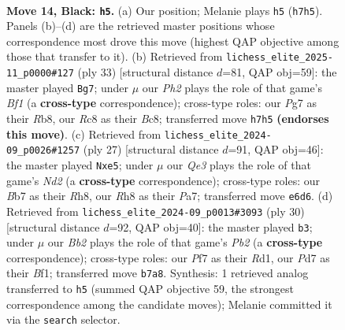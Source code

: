 \documentclass[11pt]{article}
\begin{document}
\clearpage

\begin{figure}[p]\centering
\begin{subfigure}{0.46\textwidth}\centering
\resizebox{\linewidth}{!}{%
\newchessgame
\chessboard[
  setfen={2r1kbnr/pb1p1ppp/4q3/2p1P1P1/2p2P1P/2P4R/PP3Q2/RNB1KB2 b Qk - 0 14},
  showmover=false,
  pgfstyle=straightmove, color=movearrow, markmove={h7-h5}
]}
\caption{}
\end{subfigure}\hfill
\begin{subfigure}{0.46\textwidth}\centering
\resizebox{\linewidth}{!}{%
\newchessgame
\chessboard[
  setfen={1rb1kb1r/2pp1p2/2n1q1pp/2p1P3/p1P4P/P1B2NP1/1P2QP2/2KR1B1R b k - 0 17},
  showmover=false,
  pgfstyle=straightmove, color=movearrow, markmove={f8-g7}
]}
\caption{}
\end{subfigure}
\\[4pt]
\begin{subfigure}{0.46\textwidth}\centering
\resizebox{\linewidth}{!}{%
\newchessgame
\chessboard[
  setfen={r1b1k2r/pp1nppb1/7p/2pPP1p1/1q6/1P4B1/P1PN1PPP/R2QK1NR b KQkq - 2 14},
  showmover=false,
  pgfstyle=straightmove, color=movearrow, markmove={d7-e5}
]}
\caption{}
\end{subfigure}\hfill
\begin{subfigure}{0.46\textwidth}\centering
\resizebox{\linewidth}{!}{%
\newchessgame
\chessboard[
  setfen={r1b2rk1/3n1ppp/p3p3/q2pP2P/Np1Q1P2/8/PPP3P1/2KR1B1R w - - 1 16},
  showmover=false,
  pgfstyle=straightmove, color=movearrow, markmove={b2-b3}
]}
\caption{}
\end{subfigure}
\caption{\textbf{Move 14, Black: \texttt{h5}.} (a) Our position; Melanie plays \texttt{h5} (\texttt{h7h5}). Panels (b)--(d) are the retrieved master positions whose correspondence most drove this move (highest QAP objective among those that transfer to it). (b) Retrieved from \texttt{lichess\_elite\_2025-11\_p0000\#127} (ply 33) [structural distance $d$=81, QAP obj=59]: the master played \texttt{Bg7}; under $\mu$ our \emph{Ph2} plays the role of that game's \emph{Bf1} (a \textbf{cross-type} correspondence); cross-type roles: our \emph{P}g7 as their \emph{R}b8, our \emph{R}c8 as their \emph{B}c8; transferred move \texttt{h7h5} \textbf{(endorses this move)}. (c) Retrieved from \texttt{lichess\_elite\_2024-09\_p0026\#1257} (ply 27) [structural distance $d$=91, QAP obj=46]: the master played \texttt{Nxe5}; under $\mu$ our \emph{Qe3} plays the role of that game's \emph{Nd2} (a \textbf{cross-type} correspondence); cross-type roles: our \emph{B}b7 as their \emph{R}h8, our \emph{R}h8 as their \emph{P}a7; transferred move \texttt{e6d6}. (d) Retrieved from \texttt{lichess\_elite\_2024-09\_p0013\#3093} (ply 30) [structural distance $d$=92, QAP obj=40]: the master played \texttt{b3}; under $\mu$ our \emph{Bb2} plays the role of that game's \emph{Pb2} (a \textbf{cross-type} correspondence); cross-type roles: our \emph{P}f7 as their \emph{R}d1, our \emph{P}d7 as their \emph{B}f1; transferred move \texttt{b7a8}. Synthesis: 1 retrieved analog transferred to \texttt{h5} (summed QAP objective 59, the strongest correspondence among the candidate moves); Melanie committed it via the \texttt{search} selector.}
\label{fig:thought-m27}
\end{figure}
\end{document}
